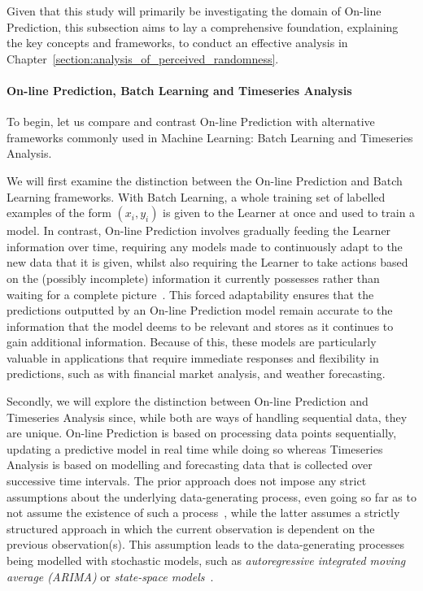 Given that this study will primarily be investigating the domain of On-line Prediction, this subsection aims to lay a comprehensive foundation, explaining the key concepts and frameworks, to conduct an effective analysis in Chapter~\ref{section:analysis_of_perceived_randomness}.

\paragraph{On-line Prediction, Batch Learning and Timeseries Analysis}\label{paragraph:on-line_prediction_batch_learning_and_timeseries_analysis}
To begin, let us compare and contrast On-line Prediction with alternative frameworks commonly used in Machine Learning: Batch Learning and Timeseries Analysis.

We will first examine the distinction between the On-line Prediction and Batch Learning frameworks. With Batch Learning, a whole training set of labelled examples of the form $(x_i, y_i)$ is given to the Learner at once and used to train a model. In contrast, On-line Prediction involves gradually feeding the Learner information over time, requiring any models made to continuously adapt to the new data that it is given, whilst also requiring the Learner to take actions based on the (possibly incomplete) information it currently possesses rather than waiting for a complete picture~\cite{kalnishkan:2015}. This forced adaptability ensures that the predictions outputted by an On-line Prediction model remain accurate to the information that the model deems to be relevant and stores as it continues to gain additional information. Because of this, these models are particularly valuable in applications that require immediate responses and flexibility in predictions, such as with financial market analysis, and weather forecasting.

Secondly, we will explore the distinction between On-line Prediction and Timeseries Analysis since, while both are ways of handling sequential data, they are unique. On-line Prediction is based on processing data points sequentially, updating a predictive model in real time while doing so whereas Timeseries Analysis is based on modelling and forecasting data that is collected over successive time intervals. The prior approach does not impose any strict assumptions about the underlying data-generating process, even going so far as to not assume the existence of such a process~\cite{vovk:2001}, while the latter assumes a strictly structured approach in which the current observation is dependent on the previous observation(s). This assumption leads to the data-generating processes being modelled with stochastic models, such as \textit{autoregressive integrated moving average (ARIMA)} or \textit{state-space models}~\cite{box:2015}.

